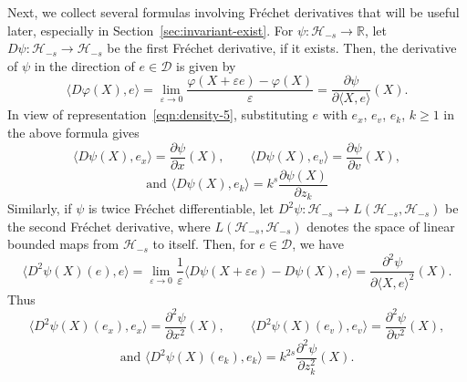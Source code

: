 \documentclass[11pt]{amsart}
\theoremstyle{definition}
\newcommand{\rbb}{\mathbb{R}}
\newcommand{\la}{\langle}
\newcommand{\ra}{\rangle}
\newcommand{\D}{\mathcal{D}}
\newcommand{\Hs}{\mathcal{H}_{-s}}
\theoremstyle{definition}
\theoremstyle{plain}
\numberwithin{equation}{section}
\begin{document}
Next, we collect several formulas involving Fr\'echet derivatives that will be useful later, especially in Section~\ref{sec:invariant-exist}. For $\psi:\Hs\to\rbb$, let $D\psi:\Hs\to\Hs$ be the first Fr\'echet derivative, if it exists. Then, the derivative of $\psi$ in the direction of $e\in\D$ is given by
\begin{displaymath}
\la D\varphi(X),e\ra=\lim_{\varepsilon\to 0}\frac{\varphi(X+\varepsilon e)-\varphi(X)}{\varepsilon}=\frac{\partial\psi}{\partial\la X,e\ra}(X).
\end{displaymath}
In view of representation~\eqref{eqn:density-5}, substituting $e$ with $e_x$, $e_v$, $e_k$, $k\geq 1$ in the above formula gives
\begin{equation} \label{eqn:Frechet:first}
\la D\psi(X),e_x\ra =\frac{\partial\psi}{\partial x}(X ),\qquad \la D\psi(X),e_v\ra =\frac{\partial\psi}{\partial v}(X ),
\end{equation}
\begin{equation*}
\text{and    }
\la D\psi(X),e_k\ra = k^s\frac{\partial\psi\left(X \right)}{\partial z_k}
\end{equation*}
Similarly, if $\psi$ is twice Fr\'echet differentiable, let $ D^2\psi:\Hs\to L(\Hs,\Hs)$ be the second Fr\'echet derivative, where $L(\Hs,\Hs)$ denotes the space of linear bounded maps from $\Hs$ to itself. Then, for $e\in\D$, we have
\begin{displaymath}
\la  D^2\psi(X)(e),e\ra=\lim_{\varepsilon\to 0}\frac{1}{\varepsilon}\la  D\psi(X+\varepsilon e)- D\psi(X),e\ra=\frac{\partial^2\psi}{\partial\la X,e\ra^2}(X).
\end{displaymath}
Thus
\begin{equation}\label{eqn:Frechet:second}
\la D^2\psi(X)(e_x),e_x\ra=\frac{\partial^2\psi}{\partial x^2}\left(X \right), \qquad \la D^2\psi(X)(e_v),e_v\ra=\frac{\partial^2\psi}{\partial v^2}\left(X \right),
\end{equation}
\begin{equation*}
\text{and  } \la D^2\psi(X)(e_k),e_k\ra=k^{2s}\frac{\partial^2\psi}{\partial z_k^{2}}\left(X \right).
\end{equation*}
\end{document}

